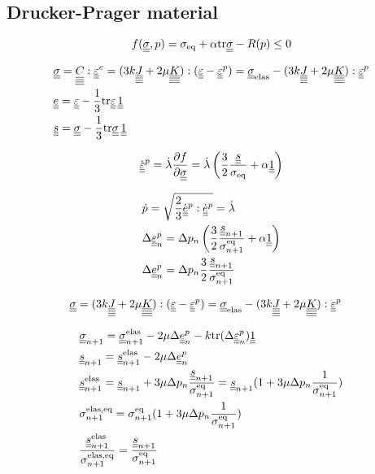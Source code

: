 \documentclass[12pt]{article}
\begin{document}
\newpage
\begin{appendices}
    \section{Drucker-Prager material}
    \label{appendix:DP}

    \begin{equation}
        f(\uusigma, p) = \sigma_{\text{eq}} + \alpha \mtr \uusigma - R(p) \leq 0
    \end{equation}

    \begin{align}
        & \uusigma = \uuuuC{} : \uueps^e = (3k\uuuuJ + 2\mu\uuuuK) : (\uueps - \uueps^p) = \uusigma_\text{elas} - (3k\uuuuJ + 2\mu\uuuuK) : \uueps^p \\
        & \uue = \uueps - \frac{1}{3}\mtr\uueps \, \uuUnit \\
        & \uus = \uusigma - \frac{1}{3}\mtr\uusigma \, \uuUnit 
    \end{align}

    \begin{equation}
        \dot{\uueps}^p = \dot{\lambda} \frac{\partial f}{\partial \uusigma} = \dot{\lambda} \left(\frac{3}{2} \frac{\uus}{\sigma_\text{eq}} + \alpha \uuUnit \right)
    \end{equation}

    \begin{align}
        & \dot{p} = \sqrt{\frac{2}{3} \dot{\uue}^p : \dot{\uue}^p} = \dot{\lambda} \\
        & \Deltaepsp = \Delta p_n \left( \frac{3}{2} \frac{\uusn}{\sigmaeqn} + \alpha \uuUnit \right) \\
        & \Deltaep = \Delta p_n \frac{3}{2} \frac{\uusn}{\sigmaeqn} 
    \end{align}

    \begin{align}
        & \uusigma = (3k\uuuuJ + 2\mu\uuuuK) : (\uueps - \uueps^p) = \uusigma_\text{elas} - (3k\uuuuJ + 2\mu\uuuuK) : \uueps^p
    \end{align}

    \begin{align}
        & \uusigma_{n+1} = \uusigma_{n+1}^\text{elas} - 2\mu \Deltaep - k \mtr (\Deltaepsp) \uuUnit \\
        & \uus_{n+1} = \uus_{n+1}^\text{elas} - 2\mu\Deltaep \\
        & \uus_{n+1}^\text{elas} = \uus_{n+1} + 3\mu\Delta p_n \frac{\uusn}{\sigmaeqn} = \uus_{n+1} (1 +  3\mu\Delta p_n \frac{1}{\sigmaeqn}) \\
        & \sigmaeqnelas = \sigmaeqn (1 +  3\mu\Delta p_n \frac{1}{\sigmaeqn}) \\
        & \frac{\uusnelas}{\sigmaeqnelas} = \frac{\uusn}{\sigmaeqn}
    \end{align}


\end{appendices}
\end{document}
